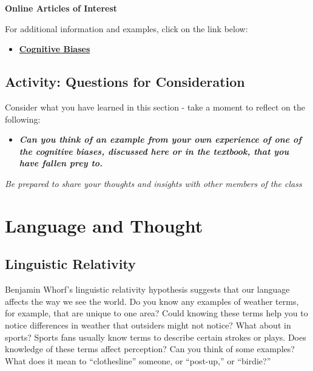 \documentclass[
]{book}
\providecommand{\tightlist}{%
  \setlength{\itemsep}{0pt}\setlength{\parskip}{0pt}}
\begin{document}
\begin{caution}
\textbf{Online Articles of Interest}

For additional information and examples, click on the link below:

\begin{itemize}
\tightlist
\item
  \href{https://en.wikipedia.org/wiki/List_of_cognitive_biases}{\textbf{Cognitive Biases}}
\end{itemize}
\end{caution}

\hypertarget{activity-questions-for-consideration-1}{%
\subsection*{Activity: Questions for Consideration}\label{activity-questions-for-consideration-1}}

\begin{reflect}
Consider what you have learned in this section - take a moment to reflect on the following:

\begin{itemize}
\tightlist
\item
  \textbf{\emph{Can you think of an example from your own experience of one of the cognitive biases, discussed here or in the textbook, that you have fallen prey to.}}
\end{itemize}

\emph{Be prepared to share your thoughts and insights with other members of the class}
\end{reflect}

\hypertarget{language-and-thought}{%
\section{Language and Thought}\label{language-and-thought}}

\hypertarget{linguistic-relativity}{%
\subsection*{Linguistic Relativity}\label{linguistic-relativity}}

Benjamin Whorf's linguistic relativity hypothesis suggests that our language affects the way we see the world. Do you know any examples of weather terms, for example, that are unique to one area? Could knowing these terms help you to notice differences in weather that outsiders might not notice? What about in sports? Sports fans usually know terms to de­scribe certain strokes or plays. Does knowledge of these terms affect percep­tion? Can you think of some examples? What does it mean to ``clothesline'' someone, or ``post-up,'' or ``birdie?''
\end{document}
